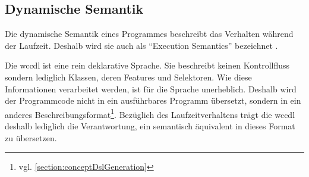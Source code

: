\subsection{Dynamische Semantik}
    Die dynamische Semantik eines Programmes beschreibt das Verhalten
    während der Laufzeit. Deshalb wird sie auch als "`Execution Semantics"' bezeichnet
    \cite[Kapitel 4.3]{voelter:DslEngineering}.

    Die \gls{wccdl} ist eine rein deklarative Sprache.
    Sie beschreibt keinen Kontrollfluss sondern lediglich
    Klassen, deren Features und Selektoren.
    Wie diese Informationen verarbeitet werden, ist für die Sprache unerheblich.
    Deshalb wird der Programmcode nicht in ein ausführbares Programm übersetzt,
    sondern in ein anderes Beschreibungsformat\footnote{vgl. \ref{section:conceptDslGeneration}}.
    Bezüglich des Laufzeitverhaltens trägt die \gls{wccdl}
    deshalb lediglich die Verantwortung, ein {\classificationModel}
    semantisch äquivalent in dieses Format zu übersetzen.